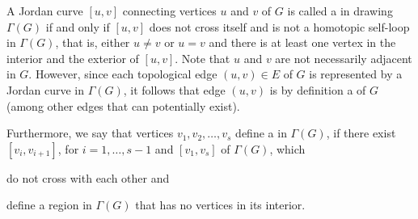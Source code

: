 A Jordan curve $[u,v]$ connecting vertices $u$ and $v$ of $G$ is called a \emph{\pe} in drawing $\Gamma(G)$ if and only if $[u,v]$ does not cross itself and is not a homotopic self-loop in $\Gamma(G)$, that is, either $u \neq v$ or $u=v$ and there is at least one vertex in the interior and the exterior of $[u,v]$. Note that $u$ and $v$ are not necessarily adjacent in $G$. However, since each topological edge $(u,v) \in E$ of $G$ is represented by a Jordan curve in $\Gamma(G)$, it follows that edge $(u,v)$ is by definition a \pe of $G$ (among other edges that can potentially exist).

Furthermore, we say that vertices $v_1,v_2,\dots,v_s$ define a \emph{\pp} in $\Gamma(G)$, if there exist \pes $[v_i,v_{i+1}]$, for $i=1,\dots, s-1$ and \pe $[v_1,v_s]$ of $\Gamma(G)$, which %
\begin{inparaenum}[(i)]
\item do not cross with each other and
\item define a region in $\Gamma(G)$ that has no vertices in its interior.
\end{inparaenum}

